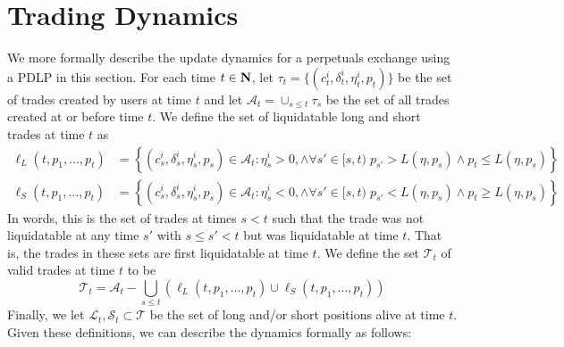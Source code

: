 \section{Trading Dynamics}\label{app:dynamics}
We more formally describe the update dynamics for a perpetuals exchange using a PDLP in this section.
For each time $t \in {\mbox{\bf N}}$, let $\tau_t = \{(c^i_t, \delta^i_t, \eta^i_t, p_t)\}$ be the set of trades created by users at time $t$ and let $\mathcal{A}_t = \cup_{s \leq t} \tau_s$ be the set of all trades created at or before time $t$.
We define the set of liquidatable long and short trades at time $t$ as
\begin{align*}
\ell_L(t, p_1, \ldots, p_t) &= \left\{ (c^i_s, \delta^i_s, \eta^i_s, p_s) \in \mathcal{A}_t : \eta^i_s > 0, \wedge \forall s' \in [s, t) \; p_{s'} > L(\eta, p_s) \wedge p_t \leq L(\eta, p_s)  \right\} \\
\ell_S(t, p_1, \ldots, p_t) &= \left\{ (c^i_s, \delta^i_s, \eta^i_s, p_s) \in \mathcal{A}_t : \eta^i_s < 0, \wedge \forall s' \in [s, t) \; p_{s'} < L(\eta, p_s) \wedge p_t \geq L(\eta, p_s)  \right\}
\end{align*}
In words, this is the set of trades at times $s < t$ such that the trade was not liquidatable at any time $s'$ with $s \leq s' < t$ but was liquidatable at time $t$.
That is, the trades in these sets are first liquidatable at time $t$.
We define the set $\mathcal{T}_t$ of valid trades at time $t$ to be
\[
\mathcal{T}_t = \mathcal{A}_t - \bigcup_{s \leq t} (\ell_L(t, p_1, \ldots, p_t) \cup \ell_S(t, p_1, \ldots, p_t) )
\]
Finally, we let $\mathcal{L}_t, \mathcal{S}_t \subset \mathcal{T}$ be the set of long and/or short positions alive at time $t$.
Given these definitions, we can describe the dynamics formally as follows:
